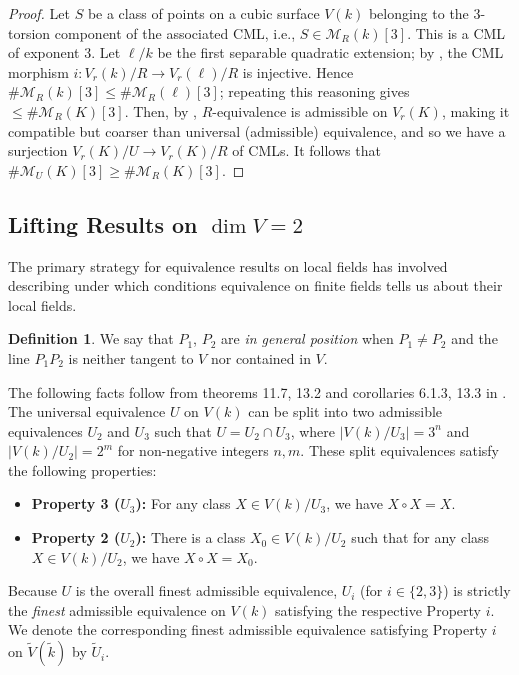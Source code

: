 \documentclass[11pt]{article}
\theoremstyle{definition}
\newtheorem{definition}[theorem]{Definition}
\begin{document}
\begin{proof}
Let $S$ be a class of points on a cubic surface $V(k)$ belonging to the 3-torsion component of the associated CML, i.e., $S \in \mathcal{M}_R(k)[3]$. This is a CML of exponent 3. Let $\ell/k$ be the first separable quadratic extension; by , the CML morphism $i: V_r(k)/R \rightarrow V_r(\ell)/R$ is injective. Hence $\#\mathcal{M}_R(k)[3] \le \#\mathcal{M}_R(\ell)[3]$; repeating this reasoning gives $\le \#\mathcal{M}_R(K)[3]$. Then, by , $R$-equivalence is admissible on $V_r(K)$, making it compatible but coarser than universal (admissible) equivalence, and so we have a surjection $V_r(K)/U \to V_r(K)/R$ of CMLs. It follows that $\#\mathcal{M}_U(K)[3] \ge \#\mathcal{M}_R(K)[3]$. \qedsymbol
\end{proof}

\subsection{Lifting Results on $\dim V = 2$}

The primary strategy for equivalence results on local fields has involved describing under which conditions equivalence on finite fields tells us about their local fields.

\begin{definition}
\label{def:general-position}
 We say that $P_1$, $P_2$ are \textit{in general position} when $P_1 \ne P_2$ and the line $P_1 P_2$ is neither tangent to $V$ nor contained in $V$.
\end{definition}

The following facts follow from theorems 11.7, 13.2 and corollaries 6.1.3, 13.3 in \cite{manin3}.\\
The universal equivalence $U$ on $V(k)$ can be split into two admissible equivalences $U_2$ and $U_3$ such that $U = U_2 \cap U_3$, where $|V(k)/U_3| = 3^n$ and $|V(k)/U_2| = 2^m$ for non-negative integers $n, m$. These split equivalences satisfy the following properties:
\begin{itemize}
    \item \textbf{Property 3 ($U_3$):} For any class $X \in V(k)/U_3$, we have $X \circ X = X$.
    \item \textbf{Property 2 ($U_2$):} There is a class $X_0 \in V(k)/U_2$ such that for any class $X \in V(k)/U_2$, we have $X \circ X = X_0$.
\end{itemize}
Because $U$ is the overall finest admissible equivalence, $U_i$ (for $i \in \{2, 3\}$) is strictly the \emph{finest} admissible equivalence on $V(k)$ satisfying the respective Property $i$. We denote the corresponding finest admissible equivalence satisfying Property $i$ on $\tilde{V}(\tilde{k})$ by $\tilde{U}_i$.
\end{document}

